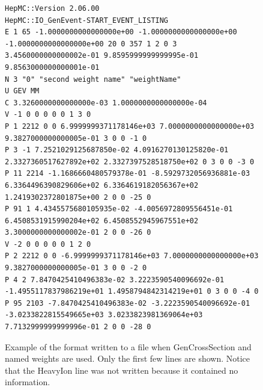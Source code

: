 \documentclass[11pt,letterpaper]{article}
\begin{document}
\begin{figure}[h]
  \begin{center}
{\tiny \begin{verbatim}
HepMC::Version 2.06.00
HepMC::IO_GenEvent-START_EVENT_LISTING
E 1 65 -1.0000000000000000e+00 -1.0000000000000000e+00 -1.0000000000000000e+00 20 0 357 1 2 0 3 3.4560000000000002e-01 9.8595999999999995e-01 9.8563000000000001e-01
N 3 "0" "second weight name" "weightName" 
U GEV MM
C 3.3260000000000000e-03 1.0000000000000000e-04
V -1 0 0 0 0 0 1 3 0
P 1 2212 0 0 6.9999999371178146e+03 7.0000000000000000e+03 9.3827000000000005e-01 3 0 0 -1 0
P 3 -1 7.2521029125687850e-02 4.0916270130125820e-01 2.3327360517627892e+02 2.3327397528518750e+02 0 3 0 0 -3 0
P 11 2214 -1.1686660480579378e-01 -8.5929732056936881e-03 6.3364496390829606e+02 6.3364619182056367e+02 1.2419302372801875e+00 2 0 0 -25 0
P 91 1 4.4345575680105935e-02 -4.0056972809556451e-01 6.4508531915990204e+02 6.4508552945967551e+02 3.3000000000000002e-01 2 0 0 -26 0
V -2 0 0 0 0 0 1 2 0
P 2 2212 0 0 -6.9999999371178146e+03 7.0000000000000000e+03 9.3827000000000005e-01 3 0 0 -2 0
P 4 2 7.8470425410496383e-02 3.2223590540096692e-01 -1.4955117837986219e+01 1.4958794842314219e+01 0 3 0 0 -4 0
P 95 2103 -7.8470425410496383e-02 -3.2223590540096692e-01 -3.0233822815549665e+03 3.0233823981369064e+03 7.7132999999999996e-01 2 0 0 -28 0
\end{verbatim}}
  \end{center}
  \caption[Example of ascii format]
          {\label{ascii_cross} Example of the format written to a file
	   when GenCrossSection and named weights are used.
           Only the first few lines are shown. 
	   Notice that the HeavyIon line was not written because it contained
	   no information. }
\end{figure}
\end{document}
